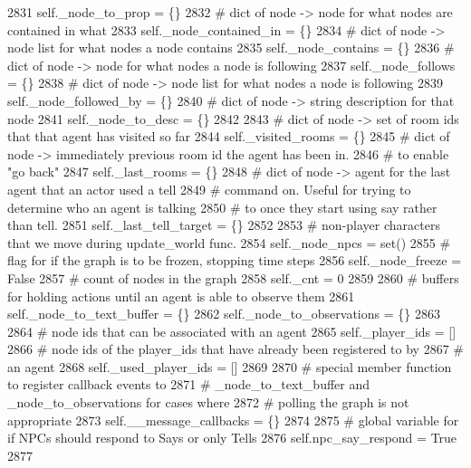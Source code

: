 \begin{DoxyCode}
2831         self.\_node\_to\_prop = \{\}
2832         \textcolor{comment}{# dict of node -> node for what nodes are contained in what}
2833         self.\_node\_contained\_in = \{\}
2834         \textcolor{comment}{# dict of node -> node list for what nodes a node contains}
2835         self.\_node\_contains = \{\}
2836         \textcolor{comment}{# dict of node -> node for what nodes a node is following}
2837         self.\_node\_follows = \{\}
2838         \textcolor{comment}{# dict of node -> node list for what nodes a node is following}
2839         self.\_node\_followed\_by = \{\}
2840         \textcolor{comment}{# dict of node -> string description for that node}
2841         self.\_node\_to\_desc = \{\}
2842 
2843         \textcolor{comment}{# dict of node -> set of room ids that that agent has visited so far}
2844         self.\_visited\_rooms = \{\}
2845         \textcolor{comment}{# dict of node -> immediately previous room id the agent has been in.}
2846         \textcolor{comment}{# to enable "go back"}
2847         self.\_last\_rooms = \{\}
2848         \textcolor{comment}{# dict of node -> agent for the last agent that an actor used a tell}
2849         \textcolor{comment}{# command on. Useful for trying to determine who an agent is talking}
2850         \textcolor{comment}{# to once they start using say rather than tell.}
2851         self.\_last\_tell\_target = \{\}
2852 
2853         \textcolor{comment}{# non-player characters that we move during update\_world func.}
2854         self.\_node\_npcs = set()
2855         \textcolor{comment}{# flag for if the graph is to be frozen, stopping time steps}
2856         self.\_node\_freeze = \textcolor{keyword}{False}
2857         \textcolor{comment}{# count of nodes in the graph}
2858         self.\_cnt = 0
2859 
2860         \textcolor{comment}{# buffers for holding actions until an agent is able to observe them}
2861         self.\_node\_to\_text\_buffer = \{\}
2862         self.\_node\_to\_observations = \{\}
2863 
2864         \textcolor{comment}{# node ids that can be associated with an agent}
2865         self.\_player\_ids = []
2866         \textcolor{comment}{# node ids of the player\_ids that have already been registered to by}
2867         \textcolor{comment}{# an agent}
2868         self.\_used\_player\_ids = []
2869 
2870         \textcolor{comment}{# special member function to register callback events to}
2871         \textcolor{comment}{# \_node\_to\_text\_buffer and \_node\_to\_observations for cases where}
2872         \textcolor{comment}{# polling the graph is not appropriate}
2873         self.\_\_message\_callbacks = \{\}
2874 
2875         \textcolor{comment}{# global variable for if NPCs should respond to Says or only Tells}
2876         self.npc\_say\_respond = \textcolor{keyword}{True}
2877 
\end{DoxyCode}


